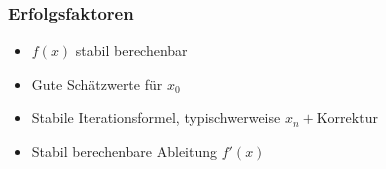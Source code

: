 %
%
%
\begin{frame}
\frametitle{Erfolgsfaktoren}
\begin{itemize}
\item<2-> $f(x)$ stabil berechenbar
\item<3-> Gute Schätzwerte für $x_0$
\item<4-> Stabile Iterationsformel, typischwerweise $x_n + \text{Korrektur}$
\item<5-> Stabil berechenbare Ableitung $f'(x)$
\end{itemize}
\end{frame}
